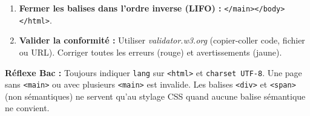 \documentclass[11pt]{article}
\begin{document}
\begin{methode}
\begin{enumerate}
\begin{itemize}
                  \item \texttt{<nav>} : Zone de navigation majeure (menus). Utiliser \texttt{<ul>}/\texttt{<li>}/\texttt{<a>} à l'intérieur.
                  \item \texttt{<main>} : Contenu principal \textbf{unique} par page. Contient \texttt{<section>} (regroupement thématique avec titre), \texttt{<article>} (contenu autonome, ex: article de blog), \texttt{<aside>} (contenu annexe, sidebar).
                  \item \texttt{<footer>} : Pied de page (copyright, mentions légales, contacts, réseaux sociaux, plan du site).
              \end{itemize}
        \item \textbf{Fermer les balises dans l'ordre inverse (LIFO) :} \texttt{</main></body></html>}.
        \item \textbf{Valider la conformité :} Utiliser \emph{validator.w3.org} (copier-coller code, fichier ou URL). Corriger toutes les erreurs (rouge) et avertissements (jaune).
    \end{enumerate}
    \textbf{Réflexe Bac :} Toujours indiquer \texttt{lang} sur \texttt{<html>} et \texttt{charset UTF-8}. Une page sans \texttt{<main>} ou avec plusieurs \texttt{<main>} est invalide. Les balises \texttt{<div>} et \texttt{<span>} (non sémantiques) ne servent qu'au stylage CSS quand aucune balise sémantique ne convient.
\end{methode}
\end{document}
